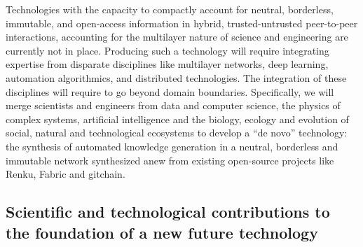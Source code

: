 \documentclass[12pt, a4paper]{article} %
\begin{document}
Technologies with the capacity to compactly account for neutral,
borderless, immutable, and open-access information in hybrid,
trusted-untrusted peer-to-peer interactions, accounting for the
multilayer nature of science and engineering are currently not in
place. Producing such a technology will require integrating expertise
from disparate disciplines like multilayer networks, deep learning,
automation algorithmics, and distributed technologies. The integration
of these disciplines will require to go beyond domain
boundaries. Specifically, we will merge scientists and engineers from
data and computer science, the physics of complex systems, artificial
intelligence and the biology, ecology and evolution of social, natural
and technological ecosystems to develop a “de novo” technology: the
synthesis of automated knowledge generation in a neutral, borderless
and immutable network synthesized anew from existing open-source
projects like Renku, Fabric and gitchain.


\subsection{Scientific and technological contributions to the
  foundation of a new future technology}
\end{document}
